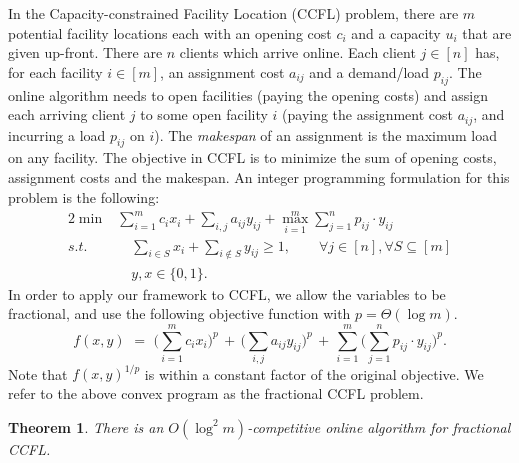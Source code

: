 \documentclass[letterpaper,11pt]{article}
\newtheorem{thm}{Theorem}[section]
\begin{document}
In the Capacity-constrained Facility Location (CCFL) problem, there are
$m$ potential facility locations each with an opening cost $c_i$ and a
capacity $u_i$ that are given up-front. There are $n$ clients which
arrive online. Each client $j\in [n]$ has, for each facility $i\in[m]$,
an assignment cost $a_{ij}$ and a demand/load $p_{ij}$. The online
algorithm needs to open facilities (paying the opening costs) and assign
each arriving client $j$ to some open facility $i$ (paying the
assignment cost $a_{ij}$, and incurring a load $p_{ij}$ on $i$). The
\emph{makespan} of an assignment is the maximum load on any
facility. The objective in CCFL is to minimize the sum of opening costs,
assignment costs and the makespan. An integer programming formulation for
this problem is the following:
\begin{alignat*}{2}
  \min & \sum_{i=1}^{m}c_i x_i + \sum_{i,j}a_{ij}y_{ij} + \max_{i=1}^{m}\sum_{j=1}^{n}p_{ij} \cdot y_{ij}\\
  s.t. & \quad \sum_{i\in S} x_i + \sum_{i\notin S}y_{ij} \geq 1, \qquad
  \forall j \in [n], \forall S \subseteq [m] \\
  &\quad y, x \in \{0,1\}.
\end{alignat*}
In order to apply our framework to CCFL, we allow the variables to be
fractional, and use the following objective function with $p=\Theta(\log
m)$.
\[ f(x,y) \,\,=\,\, \bigg(\sum_{i=1}^{m}c_i x_i \bigg)^p \,+\, \bigg(
\sum_{i,j}a_{ij}y_{ij}\bigg)^p \, + \,
\sum_{i=1}^{m}\bigg(\sum_{j=1}^{n}p_{ij} \cdot y_{ij}\bigg)^p. \] Note
that $f(x,y)^{1/p}$ is within a constant factor of the original
objective. We refer to the above convex program as the fractional CCFL
problem.

\begin{thm}\label{thm:f-CCFL}
There is an $O(\log^2 m)$-competitive online algorithm for fractional CCFL.
\end{thm}
\end{document}
